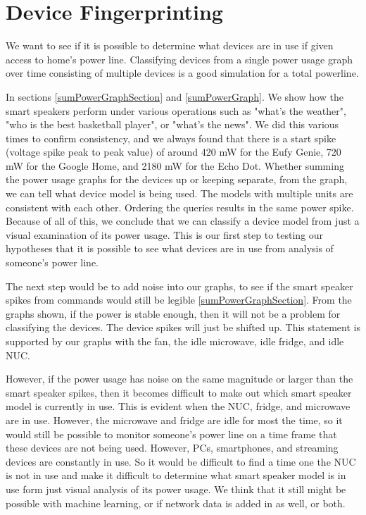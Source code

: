 \section{Device Fingerprinting}
We want to see if it is possible to determine what devices are in use if given access to home's power line. Classifying devices from a single power usage graph over time consisting of multiple devices is a good simulation for a total powerline.

In sections \ref{sumPowerGraphSection} and \ref{sumPowerGraph}. We show how the smart speakers perform under various operations such as "what's the weather", "who is the best basketball player", or "what's the news". We did this various times to confirm consistency, and we always found that there is a start spike (voltage spike peak to peak value) of around 420 mW for the Eufy Genie, 720 mW for the Google Home, and 2180 mW for the Echo Dot. Whether summing the power usage graphs for the devices up or keeping separate, from the graph, we can tell what device model is being used. The models with multiple units are consistent with each other. Ordering the queries results in the same power spike. Because of all of this, we conclude that we can classify a device model from just a visual examination of its power usage. This is our first step to testing our hypotheses that it is possible to see what devices are in use from analysis of someone's power line.

The next step would be to add noise into our graphs, to see if the smart speaker spikes from commands would still be legible \ref{sumPowerGraphSection}. From the graphs shown, if the power is stable enough, then it will not be a problem for classifying the devices. The device spikes will just be shifted up. This statement is supported by our graphs with the fan, the idle microwave, idle fridge, and idle NUC.

However, if the power usage has noise on the same magnitude or larger than the smart speaker spikes, then it becomes difficult to make out which smart speaker model is currently in use. This is evident when the NUC, fridge, and microwave are in use. However, the microwave and fridge are idle for most the time, so it would still be possible to monitor someone's power line on a time frame that these devices are not being used. However, PCs, smartphones, and streaming devices are constantly in use. So it would be difficult to find a time one the NUC is not in use and make it difficult to determine what smart speaker model is in use form just visual analysis of its power usage. We think that it still might be possible with machine learning, or if network data is added in as well, or both.

